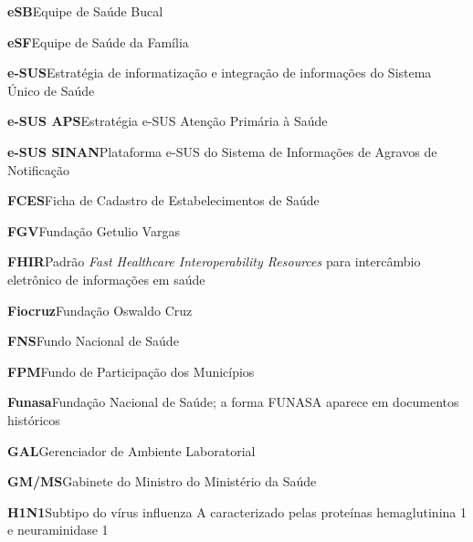 \noindent\textbf{eSB}\hspace{1em}Equipe de Saúde Bucal\par\smallskip
\noindent\textbf{eSF}\hspace{1em}Equipe de Saúde da Família\par\smallskip
\noindent\textbf{e-SUS}\hspace{1em}Estratégia de informatização e integração de informações do Sistema Único de Saúde\par\smallskip
\noindent\textbf{e-SUS APS}\hspace{1em}Estratégia e-SUS Atenção Primária à Saúde\par\smallskip
\noindent\textbf{e-SUS SINAN}\hspace{1em}Plataforma e-SUS do Sistema de Informações de Agravos de Notificação\par\smallskip
\noindent\textbf{FCES}\hspace{1em}Ficha de Cadastro de Estabelecimentos de Saúde\par\smallskip
\noindent\textbf{FGV}\hspace{1em}Fundação Getulio Vargas\par\smallskip
\noindent\textbf{FHIR}\hspace{1em}Padrão \emph{Fast Healthcare Interoperability Resources} para intercâmbio eletrônico de informações em saúde\par\smallskip
\noindent\textbf{Fiocruz}\hspace{1em}Fundação Oswaldo Cruz\par\smallskip
\noindent\textbf{FNS}\hspace{1em}Fundo Nacional de Saúde\par\smallskip
\noindent\textbf{FPM}\hspace{1em}Fundo de Participação dos Municípios\par\smallskip
\noindent\textbf{Funasa}\hspace{1em}Fundação Nacional de Saúde; a forma FUNASA aparece em documentos históricos\par\smallskip
\noindent\textbf{GAL}\hspace{1em}Gerenciador de Ambiente Laboratorial\par\smallskip
\noindent\textbf{GM/MS}\hspace{1em}Gabinete do Ministro do Ministério da Saúde\par\smallskip
\noindent\textbf{H1N1}\hspace{1em}Subtipo do vírus influenza A caracterizado pelas proteínas hemaglutinina 1 e neuraminidase 1\par\smallskip
